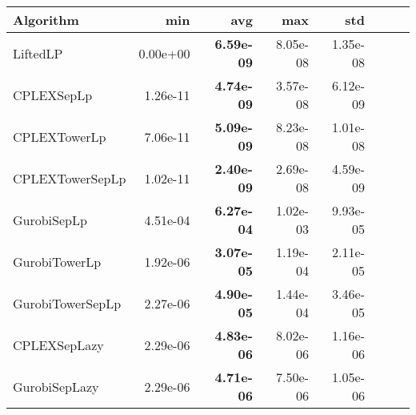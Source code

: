 \begin{tabular}{lrrrrrrr}
Algorithm & min & avg & max & std
\\
\hline
LiftedLP&0.00e+00& \bf6.59e-09& 8.05e-08& 1.35e-08\\
CPLEXSepLp&1.26e-11& \bf4.74e-09& 3.57e-08& 6.12e-09\\
CPLEXTowerLp&7.06e-11& \bf5.09e-09& 8.23e-08& 1.01e-08\\
CPLEXTowerSepLp&1.02e-11& \bf2.40e-09& 2.69e-08& 4.59e-09\\
GurobiSepLp&4.51e-04& \bf6.27e-04& 1.02e-03& 9.93e-05\\
GurobiTowerLp&1.92e-06& \bf3.07e-05& 1.19e-04& 2.11e-05\\
GurobiTowerSepLp&2.27e-06& \bf4.90e-05& 1.44e-04& 3.46e-05\\
CPLEXSepLazy&2.29e-06& \bf4.83e-06& 8.02e-06& 1.16e-06\\
GurobiSepLazy&2.29e-06& \bf4.71e-06& 7.50e-06& 1.05e-06
\end{tabular}

